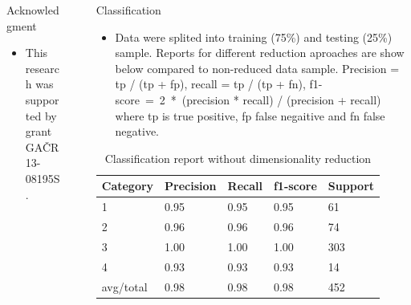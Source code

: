 \documentclass[final,hyperref={pdfpagelabels=false}]{beamer}
\begin{document}
\begin{frame}[t]
\begin{columns}[t]
\begin{column}{.465\textwidth}
\begin{block}{Acknowledgment}

\begin{itemize}
\item This research was supported by grant GAČR 13-08195S.
\end{itemize}

\end{block}



\end{column} %

\begin{column}{.03\textwidth}\end{column} %
 
\begin{column}{.465\textwidth} %


\begin{block}{Classification}
\begin{itemize}
\item Data were splited into training (75\%) and testing (25\%) sample. Reports for different reduction aproaches are show below compared to non-reduced data sample. Precision =  tp / (tp + fp), recall = tp / (tp + fn), f1-score~=~2~*~(precision * recall) / (precision + recall) where tp is true positive, fp false negaitive and fn false negative.
\end{itemize}

\begin{table}
\begin{tabular}{l l l l l}
\toprule
\textbf{Category} & \textbf{Precision} & \textbf{Recall} & \textbf{f1-score} & \textbf{Support}\\
\midrule
1 &      0.95	&  0.95	 &   0.95 &      61 \\ 
2 &      0.96	&  0.96	 &   0.96 &      74 \\ 
3 &      1.00	&  1.00	 &   1.00 &      303\\ 
4 &      0.93	&  0.93	 &   0.93 &      14 \\ 
\midrule
avg/total   & 0.98   &   0.98  &    0.98  &     452 \\
\bottomrule
\end{tabular}
\caption{Classification report without dimensionality reduction}
\end{table}



\end{block}
\end{column}
\end{columns}
\end{frame}
\end{document}

